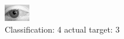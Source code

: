 \begin{figure}[h!]
\begin{center}
\includegraphics[width=0.60\columnwidth]{figures/ID2798_class_4_target_3.png}
\end{center}
\caption{ Classification: 4 actual target: 3}
\label{fig:ID2798_class_4_target_3}
\end{figure}
